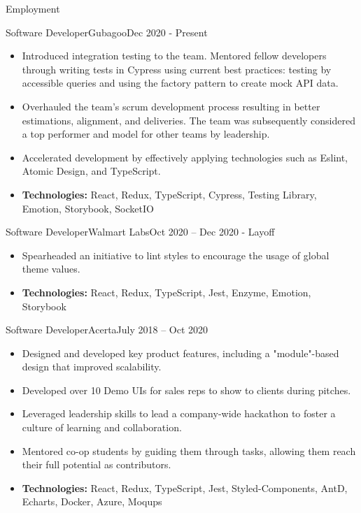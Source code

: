 \documentclass[]{mcdowellcv}
\begin{document}
	\begin{cvsection}{Employment}
		\begin{cvsubsection}{Software Developer}{Gubagoo}{Dec 2020 - Present}
 			\begin{itemize}
 			    \item Introduced integration testing to the team. Mentored fellow developers through writing tests in Cypress using current best practices: testing by accessible queries and using the factory pattern to create mock API data.
				\item Overhauled the team's scrum development process resulting in better estimations, alignment, and deliveries. The team was subsequently considered a top performer and model for other teams by leadership.
				\item Accelerated development by effectively applying technologies such as Eslint, Atomic Design, and TypeScript.
				\item \textbf{Technologies:} React, Redux, TypeScript, Cypress, Testing Library, Emotion, Storybook, SocketIO
			\end{itemize}
		\end{cvsubsection}
		\begin{cvsubsection}{Software Developer}{Walmart Labs}{Oct 2020 -- Dec 2020 - Layoff}
			\begin{itemize}
				\item Spearheaded an initiative to lint styles to encourage the usage of global theme values.
				\item \textbf{Technologies:} React, Redux, TypeScript, Jest, Enzyme, Emotion, Storybook
			\end{itemize}
		\end{cvsubsection}
		\begin{cvsubsection}{Software Developer}{Acerta}{July 2018 -- Oct 2020}
			\begin{itemize}
				\item Designed and developed key product features, including a "module"-based design that improved scalability.
				\item Developed over 10 Demo UIs for sales reps to show to clients during pitches.
				\item Leveraged leadership skills to lead a company-wide hackathon to foster a culture of learning and collaboration.
				\item Mentored co-op students by guiding them through tasks, allowing them reach their full potential as contributors.
				\item \textbf{Technologies:} React, Redux, TypeScript, Jest, Styled-Components, AntD, Echarts, Docker, Azure, Moqups
			\end{itemize}
		\end{cvsubsection}


\end{cvsection}
\end{document}
